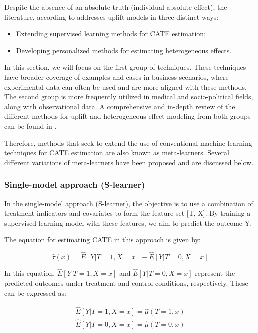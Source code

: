 Despite the absence of an absolute truth (individual absolute effect), the literature, according to \textcite{zhang_unified_2022} addresses uplift models in three distinct ways:

\begin{itemize}
  \item Extending supervised learning methods for CATE estimation;
  \item Developing personalized methods for estimating heterogeneous effects.
\end{itemize}

In this section, we will focus on the first group of techniques. These techniques have broader coverage of examples and cases in business scenarios, where experimental data can often be used and are more aligned with these methods. 
The second group is more frequently utilized in medical and socio-political fields, along with observational data. A comprehensive and in-depth review of the different methods for uplift and heterogeneous effect modeling from both groups can be found in \textcite{zhang_unified_2022}.

Therefore, methods that seek to extend the use of conventional machine learning techniques for CATE estimation are also known as meta-learners. Several different variations of meta-learners have been proposed and are discussed below.

\subsubsection{Single-model approach (S-learner)}

In the single-model approach (S-learner), the objective is to use a combination of treatment indicators and covariates to form the feature set [T, X]. By training a supervised learning model with these features, we aim to predict the outcome Y.

The equation for estimating CATE in this approach is given by:

\begin{equation}
  \hat{\tau}(x) = \hat{E}[Y | T = 1, X = x] - \hat{E}[Y | T = 0, X = x]
  \label{eq:s_learner}
\end{equation}

In this equation, $\hat{E}[Y | T = 1, X = x]$ and $\hat{E}[Y | T = 0, X = x]$ represent the predicted outcomes under treatment and control conditions, respectively. These can be expressed as:

\begin{equation}
  \begin{aligned}
    \hat{E}[Y | T = 1, X = x] = \hat{\mu}(T = 1, x) \\
    \hat{E}[Y | T = 0, X = x] = \hat{\mu}(T = 0, x)
  \end{aligned}
  \label{eq:s_learner_treatment}
\end{equation}

